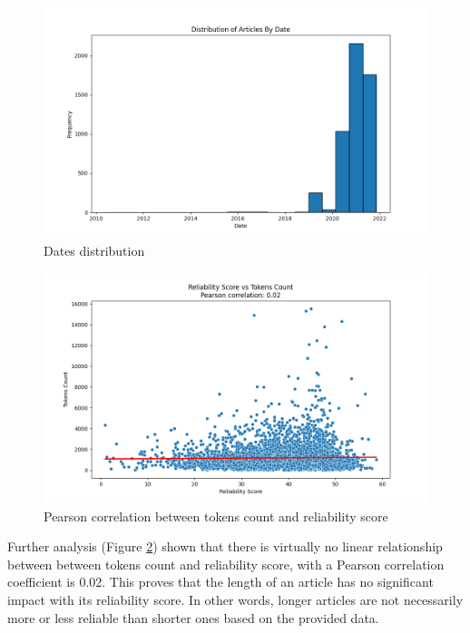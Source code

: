 \begin{figure}[ht]
    \centering
    \includegraphics[width=0.9\linewidth]{figures/dates_hist.png}
    \caption{Dates distribution}
    \label{fig:dates_hist}
\end{figure}

\begin{figure}[ht]
    \centering
    \includegraphics[width=0.9\linewidth]{figures/correlation_tokens_reliability_score.png}
    \caption{Pearson correlation between tokens count and reliability score}
    \label{fig:pearson_correlation}
\end{figure}



Further analysis (Figure \ref{fig:pearson_correlation}) shown that there is virtually no linear relationship between between tokens count and reliability score, with a Pearson correlation coefficient is 0.02. This proves that the length of an article has no significant impact with its reliability score. In other words, longer articles are not necessarily more or less reliable than shorter ones based on the provided data.

